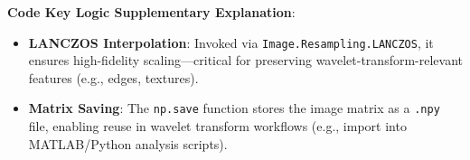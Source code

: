 \documentclass{article}
\theoremstyle{definition} %
\begin{document}








\textbf{Code Key Logic Supplementary Explanation}:
\begin{itemize}
    \item \textbf{LANCZOS Interpolation}: Invoked via \texttt{Image.Resampling.LANCZOS}, it ensures high-fidelity scaling—critical for preserving wavelet-transform-relevant features (e.g., edges, textures).
    \item \textbf{Matrix Saving}: The \texttt{np.save} function stores the image matrix as a \texttt{.npy} file, enabling reuse in wavelet transform workflows (e.g., import into MATLAB/Python analysis scripts).
\end{itemize}
\end{document}
